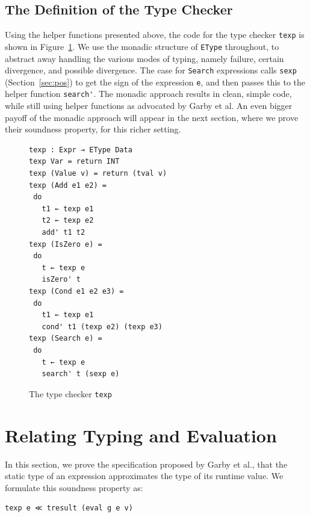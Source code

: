 \documentclass[acmsmall,screen,review]{acmart}
\begin{document}
\subsection{The Definition of the Type Checker}

Using the helper functions presented above, the code for the type
checker \verb|texp| is shown in Figure~\ref{fig:texp}.  We use the
monadic structure of \verb|EType| throughout, to abstract away
handling the various modes of typing, namely failure, certain
divergence, and possible divergence.  The case for \verb|Search|
expressions calls \verb|sexp| (Section~\ref{sec:pos}) to get the sign
of the expression \verb|e|, and then passes this to the helper
function \verb|search'|.  The monadic approach results in clean,
simple code, while still using helper functions as advocated by Garby
et al.  An even bigger payoff of the monadic approach will appear in
the next section, where we prove their soundness property, for this
richer setting.


\begin{figure}
\begin{verbatim}
texp : Expr → EType Data
texp Var = return INT
texp (Value v) = return (tval v)
texp (Add e1 e2) = 
 do
   t1 ← texp e1
   t2 ← texp e2
   add' t1 t2
texp (IsZero e) =
 do
   t ← texp e
   isZero' t
texp (Cond e1 e2 e3) =
 do
   t1 ← texp e1
   cond' t1 (texp e2) (texp e3)
texp (Search e) =
 do
   t ← texp e
   search' t (sexp e)
\end{verbatim}
\caption{The type checker \texttt{texp}}
\label{fig:texp}
\end{figure}

\section{Relating Typing and Evaluation}
\label{sec:snd}

In this section, we prove the specification proposed by Garby et al., that
the static type of an expression approximates the type of its runtime value.  We
formulate this soundness property as:

\begin{verbatim}
texp e ≪ tresult (eval g e v)
\end{verbatim}
\end{document}
